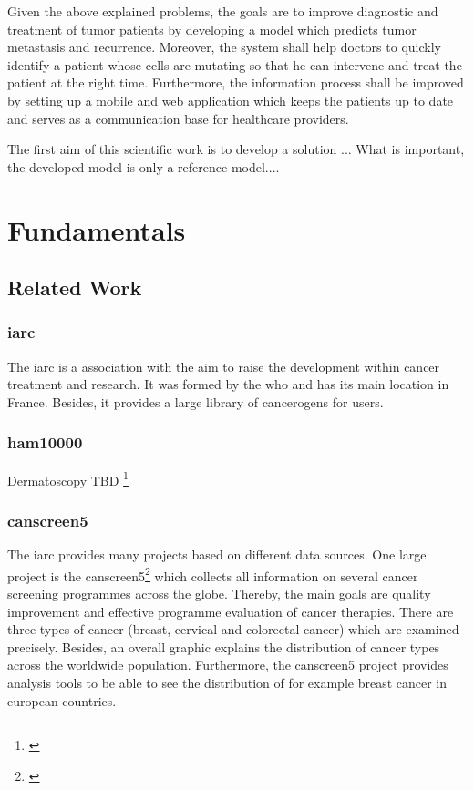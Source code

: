 Given the above explained problems, the goals are to improve diagnostic and treatment of tumor patients by developing a model which predicts tumor metastasis and recurrence. Moreover, the system shall help doctors to quickly identify a patient whose cells are mutating so that he can intervene and treat the patient at the right time. Furthermore, the information process shall be improved by setting up a mobile and web application which keeps the patients up to date and serves as a communication base for healthcare providers.

The first aim of this scientific work is to develop a solution ...
What is important, the developed model is only a reference model....

\chapter{Fundamentals}\label{fundamentals}

\section{Related Work}

\subsection{\ac{iarc}}

The \ac{iarc} is a association with the aim to raise the development within cancer treatment and research. It was formed by the \ac{who} and has its main location in France. Besides, it provides a large library of cancerogens for users.


\subsection{\ac{ham10000}}
Dermatoscopy TBD 
\footnote{\cite{ham10000}}

\subsection{\ac{canscreen5}}

The \ac{iarc} provides many projects based on different data sources. One large project is the \ac{canscreen5}\footnote{\cite{iarc_canscreen5_project}} which collects all information on several cancer screening programmes across the globe. Thereby, the main goals are quality improvement and effective programme evaluation of cancer therapies. There are three types of cancer (breast, cervical and colorectal cancer) which are examined precisely. Besides, an overall graphic explains the distribution of cancer types across the worldwide population. Furthermore, the \ac{canscreen5} project provides analysis tools to be able to see the distribution of for example breast cancer in european countries.  

